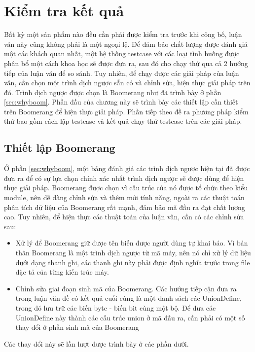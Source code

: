 \chapter{Kiểm tra kết quả}

Bất kỳ một sản phẩm nào đều cần phải được kiểm tra trước khi công bố, luận văn này cũng không phải là một ngoại lệ. Để đảm bảo chất lượng được đánh giá một các khách quan nhất, một hệ thống testcase với các loại tình huống được phân bổ một cách khoa học sẽ được đưa ra, sau đó cho chạy thử qua cả 2 hướng tiếp của luận văn để so sánh. Tuy nhiên, để chạy được các giải pháp của luận văn, cần chọn một trình dịch ngược sẵn có và chỉnh sửa, hiện thực giải pháp trên đó. Trình dịch ngược được chọn là Boomerang như đã trình bày ở phần \ref{sec:whyboom}. Phần đầu của chương này sẽ trình bày các thiết lập cần thiết trên Boomerang để hiện thực giải pháp. Phần tiếp theo đề ra phương pháp kiểm thử bao gồm cách lập testcase và kết quả chạy thử testcase trên các giải pháp.

\section{Thiết lập Boomerang}

\label{sec:boomchange}
Ở phần \ref{sec:whyboom}, một bảng đánh giá các trình dịch ngược hiện tại đã được đưa ra để có sự lựa chọn chính xác nhất trình dịch ngược sẽ được dùng để hiện thực giải pháp. Boomerang được chọn vì cấu trúc của nó được tổ chức theo kiểu module, nên dễ dàng chỉnh sửa và thêm mới tính năng, ngoài ra các thuật toán phân tích dữ liệu của Boomerang rất mạnh, đảm bảo mã đầu ra đạt chất lượng cao. Tuy nhiên, để hiện thực các thuật toán của luận văn, cần có các chỉnh sửa sau:
\begin{itemize}
	\item Xử lý để Boomerang giữ được tên biến được người dùng tự khai báo. Vì bản thân Boomerang là một trình dịch ngược từ mã máy, nên nó chỉ xử lý dữ liệu dưới dạng thanh ghi, các thanh ghi này phải được định nghĩa trước trong file đặc tả của từng kiến trúc máy.
	\item Chỉnh sửa giai đoạn sinh mã của Boomerang. Các hướng tiếp cận đưa ra trong luận văn đề có kết quả cuối cùng là một danh sách các UnionDefine, trong đó lưu trữ các biến byte - biến bit cùng một bộ. Để đưa các UnionDefine này thành các cấu trúc union ở mã đầu ra, cần phải có một số thay đổi ở phần sinh mã của Boomerang
\end{itemize}
Các thay đổi này sẽ lần lượt được trình bày ở các phần dưới.

